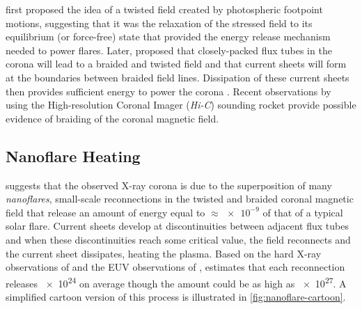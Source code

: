 \citet{gold_magnetic_1964} first proposed the idea of a twisted field created by photospheric footpoint motions, suggesting that it was the relaxation of the stressed field to its equilibrium (or force-free) state that provided the energy release mechanism needed to power flares. Later, \citet{parker_topological_1972} proposed that closely-packed flux tubes in the corona will lead to a braided and twisted field and that current sheets will form at the boundaries between braided field lines. Dissipation of these current sheets then provides sufficient energy to power the corona \citep{parker_magnetic_1983,parker_magnetic_1983-1}. Recent observations by \citet{cirtain_energy_2013} using the High-resolution Coronal Imager (\textit{Hi-C}) sounding rocket provide possible evidence of braiding of the coronal magnetic field.

\subsection{Nanoflare Heating}\label{sec:nanoflares}

\citet{parker_nanoflares_1988} suggests that the observed X-ray corona is due to the superposition of many \textit{nanoflares}, small-scale reconnections in the twisted and braided coronal magnetic field that release an amount of energy equal to $\approx\num{e-9}$ of that of a typical solar flare. Current sheets develop at discontinuities between adjacent flux tubes and when these discontinuities reach some critical value, the field reconnects and the current sheet dissipates, heating the plasma. Based on the hard X-ray observations of \citet{lin_solar_1984} and the EUV observations of \citet{brueckner_observations_1983}, \citeauthor{parker_nanoflares_1988} estimates that each reconnection releases \SI{e24}{\erg} on average though the amount could be as high as \SI{e27}{\erg}. A simplified cartoon version of this process is illustrated in \autoref{fig:nanoflare-cartoon}.

